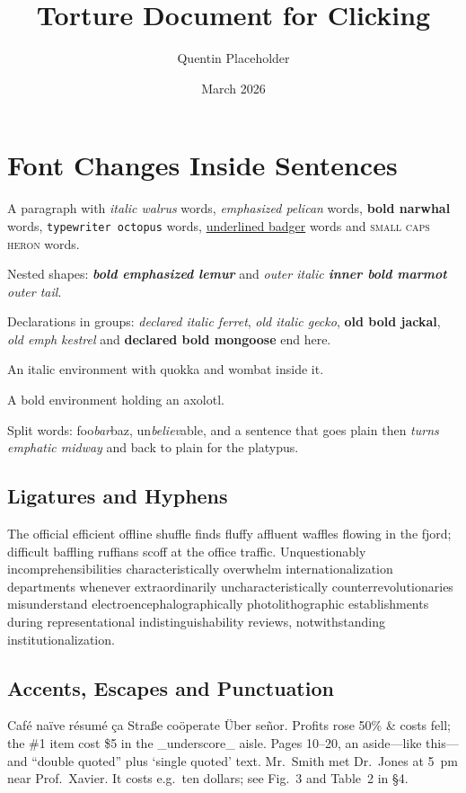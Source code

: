 \documentclass[11pt]{article}
\title{Torture Document for Clicking}
\author{Quentin Placeholder}
\date{March 2026}
\begin{document}
\maketitle

\section{Font Changes Inside Sentences}
A paragraph with \textit{italic walrus} words, \emph{emphasized pelican} words,
\textbf{bold narwhal} words, \texttt{typewriter octopus} words,
\underline{underlined badger} words and \textsc{small caps heron} words.

Nested shapes: \textbf{\emph{bold emphasized lemur}} and
\textit{outer italic \textbf{inner bold marmot} outer tail}.

Declarations in groups: {\itshape declared italic ferret}, {\it old italic
gecko}, {\bf old bold jackal}, {\em old emph kestrel} and
{\bfseries declared bold mongoose} end here.

\begin{itshape}
An italic environment with quokka and wombat inside it.
\end{itshape}

\begin{bfseries}
A bold environment holding an axolotl.
\end{bfseries}

Split words: foo\emph{bar}baz, un\textit{believ}able, and a sentence that
goes plain then \emph{turns emphatic midway} and back to plain for the platypus.

\subsection{Ligatures and Hyphens}
The official efficient offline shuffle finds fluffy affluent waffles flowing
in the fjord; difficult baffling ruffians scoff at the office traffic.
Unquestionably incomprehensibilities characteristically overwhelm
internationalization departments whenever extraordinarily uncharacteristically
counterrevolutionaries misunderstand electroencephalographically
photolithographic establishments during representational indistinguishability
reviews, notwithstanding institutionalization.

\subsection{Accents, Escapes and Punctuation}
Caf\'e na\"ive r\'esum\'e \c{c}a Stra\ss e co\"operate \"Uber se\~nor.
Profits rose 50\% \& costs fell; the \#1 item cost \$5 in the \_underscore\_ aisle.
Pages 10--20, an aside---like this---and ``double quoted'' plus `single quoted' text.
Mr.~Smith met Dr.\ Jones at 5~pm near Prof.~Xavier.
It costs e.g.\ ten dollars; see Fig.~3 and Table~2 in \S 4.
\end{document}
